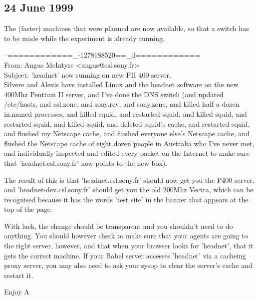 \subsection*{24 June 1999}

The (faster) machines that were planned are now available, so that a switch has to be made while the 
experiment is already running. 
\newline

\begin{mail}
--============\_-1278188520==\_d============\\
From: Angus McIntyre <angus@csl.sony.fr>\\
Subject: 'headnet' now running on new PII 400 server.\\

Silvere and Alexis have installed Linux and the headnet software on the 
new 400Mhz Pentium II server, and I've done the DNS switch (and updated
/etc/hosts, and csl.zone, and sony.rev, and sony.zone, and killed half 
a dozen in.named processes, and killed squid, and restarted 
squid, and killed squid, and restarted squid, and killed squid, 
and deleted squid's cache, and restarted squid, and flushed my Netscape
cache, and flushed everyone else's Netscape cache, and flushed the 
Netscape cache of eight dozen people in Australia who I've never 
met, and individually inspected and edited every packet on the 
Internet to make sure that 'headnet.csl.sony.fr' now points to the new box).

The result of this is that 'headnet.csl.sony.fr' should now get 
you the P400 server, and 'headnet-dev.csl.sony.fr' should get you the 
old 200Mhz Vectra, which can be recognised because it has the words 'test 
site' in the banner that appears at the top of the page.

With luck, the change should be transparent and you shouldn't need 
to do anything. You should however check to make sure that your agents 
are going to the right server, however, and that when your browser looks 
for 'headnet', that it gets the correct machine. If your Babel server 
accesses 'headnet' via a cacheing proxy server, you may also need to 
ask your sysop to clear the server's cache and restart it.

Enjoy 
A
\end{mail}
\clearpage
